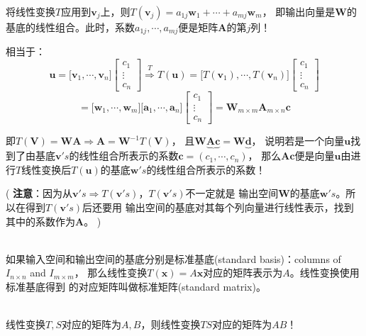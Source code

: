 将线性变换$T$应用到$\boldsymbol{v}_{j}$上，则$T(\boldsymbol{v}_{j}) = a_{1j} \boldsymbol{w}_{1}+\cdots+a_{m j} \boldsymbol{w}_{m}$，
即输出向量是$\boldsymbol{W}$的基底的线性组合。此时，系数$a_{1j},\cdots,a_{mj}$便是矩阵$\boldsymbol{A}$的第$j$列！

相当于：
$$
\boldsymbol{u}=\Biggl[\boldsymbol{v}_1, \cdots, \boldsymbol{v}_n\Biggr]
\begin{bmatrix}
    c_1 \\ \vdots \\ c_n
\end{bmatrix}
\stackrel{T}{\Longrightarrow}
T(\boldsymbol{u})=\Biggl[T(\boldsymbol{v}_1), \cdots, T(\boldsymbol{v}_n)\Biggr]
\begin{bmatrix}
    c_1 \\ \vdots \\ c_n
\end{bmatrix}
$$
$$
= \Biggl[\boldsymbol{w}_1, \cdots, \boldsymbol{w}_m\Biggr]
\Biggl[\boldsymbol{a}_1, \cdots, \boldsymbol{a}_n\Biggr]
\begin{bmatrix}
    c_1 \\ \vdots \\ c_n
\end{bmatrix}
= \boldsymbol{W}_{m\times m}\boldsymbol{A}_{m\times n}\boldsymbol{c}
$$

即$T(\boldsymbol{V}) = \boldsymbol{W}\boldsymbol{A} \Rightarrow \boldsymbol{A} = \boldsymbol{W}^{-1}T(\boldsymbol{V})$，
且$\boldsymbol{W\underbrace{Ac}} = \boldsymbol{W\underbrace{d}}$， 说明若是一个向量$\boldsymbol{u}$找到了由基底$\boldsymbol{v}'s$的线性组合所表示的系数$\boldsymbol{c} = (c_{1}, \cdots, c_{n})$，
那么$\boldsymbol{Ac}$便是向量$\boldsymbol{u}$由进行$T$线性变换后$T(\boldsymbol{u})$的基底$\boldsymbol{w}'s$的线性组合所表示的系数！

(
\textbf{注意}：因为从$\boldsymbol{v}'s \Rightarrow T(\boldsymbol{v}'s)$，$T(\boldsymbol{v}'s)$不一定就是
输出空间$\boldsymbol{W}$的基底$\boldsymbol{w}'s$。所以在得到$T(\boldsymbol{v}'s)$后还要用
输出空间的基底对其每个列向量进行线性表示，找到其中的系数作为$\boldsymbol{A}$。
)

\hspace*{\fill} \\
如果输入空间和输出空间的基底分别是标准基底(standard basis)：columns of $I_{n \times n}$ and $I_{m \times m}$，
那么线性变换$T(\boldsymbol{x})=A \boldsymbol{x}$对应的矩阵表示为$A$。线性变换使用标准基底得到
的对应矩阵叫做标准矩阵(standard matrix)。

\hspace*{\fill} \\
线性变换$T,S$对应的矩阵为$A,B$，则线性变换$TS$对应的矩阵为$AB$！


